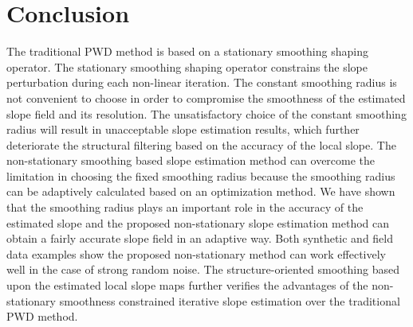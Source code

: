 \section{Conclusion}
The traditional PWD method is based on a stationary smoothing shaping operator. The stationary smoothing shaping operator constrains the slope perturbation during each non-linear iteration. The constant smoothing radius is not convenient to choose in order to compromise the smoothness of the estimated slope field and its resolution. The unsatisfactory choice of the constant smoothing radius will result in unacceptable slope estimation results, which further deteriorate the structural filtering based on the accuracy of the local slope. The non-stationary smoothing based slope estimation method can overcome the limitation in choosing the fixed smoothing radius because the smoothing radius can be adaptively calculated based on an optimization method. We have shown that the smoothing radius plays an important role in the accuracy of the estimated slope and the proposed non-stationary slope estimation method can obtain a fairly accurate slope field in an adaptive way. Both synthetic and field data examples show the proposed non-stationary method can work effectively well in the case of strong random noise. The structure-oriented smoothing based upon the estimated local slope maps further verifies the advantages of the non-stationary smoothness constrained iterative slope estimation over the traditional PWD method. 


%
%   




